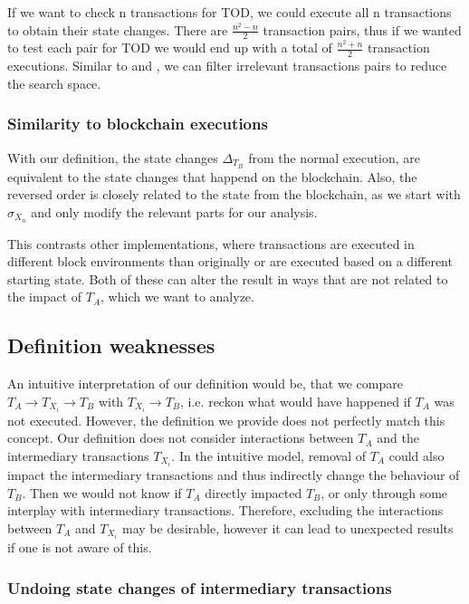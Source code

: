 \documentclass[draft,final]{vutinfth} %
\begin{document}
If we want to check n transactions for TOD, we could execute all n transactions to obtain their state changes. There are $\frac{n^2 - n}{2}$ transaction pairs, thus if we wanted to test each pair for TOD we would end up with a total of $\frac{n^2 + n}{2}$ transaction executions. Similar to \cite{torres_frontrunner_2021} and \cite{zhang_combatting_2023}, we can filter irrelevant transactions pairs to reduce the search space.

\subsubsection{Similarity to blockchain executions}

With our definition, the state changes $\Delta_{T_B}$ from the normal execution, are equivalent to the state changes that happend on the blockchain. Also, the reversed order is closely related to the state from the blockchain, as we start with $\sigma_{X_n}$ and only modify the relevant parts for our analysis.

This contrasts other implementations, where transactions are executed in different block environments than originally or are executed based on a different starting state. Both of these can alter the result in ways that are not related to the impact of $T_A$, which we want to analyze.

\subsection{Definition weaknesses}
\label{sec:weaknesses}

An intuitive interpretation of our definition would be, that we compare $T_A \rightarrow T_{X_i} \rightarrow T_B$ with $T_{X_i} \rightarrow T_B$, i.e. reckon what would have happened if $T_A$ was not executed. However, the definition we provide does not perfectly match this concept. Our definition does not consider interactions between $T_A$ and the intermediary transactions $T_{X_i}$. In the intuitive model, removal of $T_A$ could also impact the intermediary transactions and thus indirectly change the behaviour of $T_B$. Then we would not know if $T_A$ directly impacted $T_B$, or only through some interplay with intermediary transactions. Therefore, excluding the interactions between $T_A$ and $T_{X_i}$ may be desirable, however it can lead to unexpected results if one is not aware of this.

\subsubsection{Undoing state changes of intermediary transactions}
\end{document}
